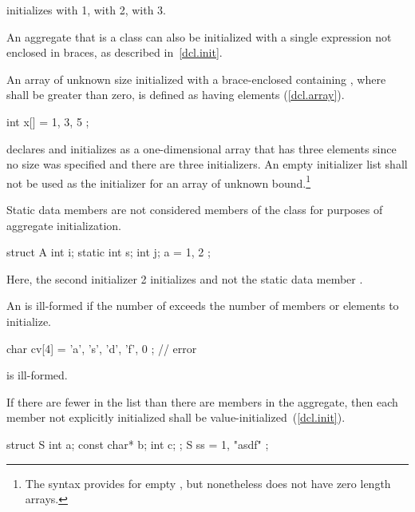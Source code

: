 initializes
with 1,
with 2,
with 3.
\exitexample

\pnum
An aggregate that is a class can also be initialized with a single
expression not enclosed in braces, as described in~\ref{dcl.init}.

\pnum
An array of unknown size initialized with a
brace-enclosed
containing
,
where
shall be greater than zero, is defined as having
elements (\ref{dcl.array}).
\enterexample

\begin{codeblock}
int x[] = { 1, 3, 5 };
\end{codeblock}

declares and initializes
as a one-dimensional array that has three elements
since no size was specified and there are three initializers.
\exitexample
An empty initializer list
\tcode{\{\}}
shall not be used as the initializer
for an array of unknown bound.\footnote{The syntax provides for empty
,
but nonetheless \Cpp does not have zero length arrays.}

\pnum
Static data members are not considered
members of the class for purposes of aggregate initialization.
\enterexample

\begin{codeblock}
struct A {
	int i;
	static int s;
	int j;
} a = { 1, 2 };
\end{codeblock}

Here, the second initializer 2 initializes
and not the static data member
.
\exitexample

\pnum
An
is ill-formed if the number of
exceeds the number of members or elements to initialize.
\enterexample

\begin{codeblock}
char cv[4] = { 'a', 's', 'd', 'f', 0 };		// error
\end{codeblock}

is ill-formed.
\exitexample

\pnum
If there are fewer
in the list than there are members in the aggregate,
then each member not explicitly initialized
shall be value-initialized~(\ref{dcl.init}).
\enterexample

\begin{codeblock}
struct S { int a; const char* b; int c; };
S ss = { 1, "asdf" };
\end{codeblock}

